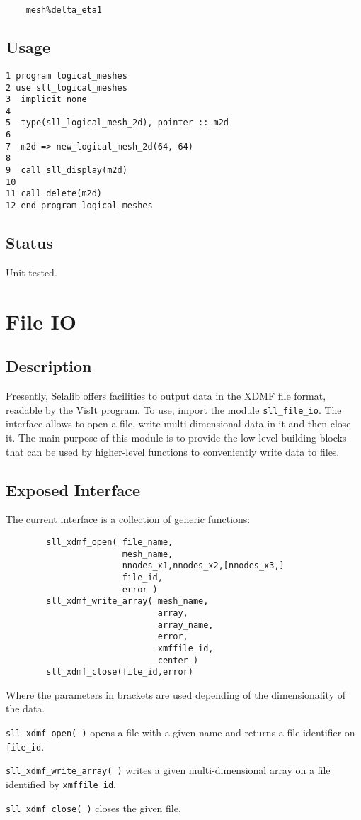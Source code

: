 \documentclass[]{report}   %
\begin{document}
\begin{verbatim}
    mesh%delta_eta1
\end{verbatim}

\subsection{Usage}

\begin{verbatim}
1 program logical_meshes
2 use sll_logical_meshes
3  implicit none
4
5  type(sll_logical_mesh_2d), pointer :: m2d
6  
7  m2d => new_logical_mesh_2d(64, 64)
8
9  call sll_display(m2d)
10
11 call delete(m2d)
12 end program logical_meshes
\end{verbatim}

\subsection{Status}
Unit-tested.


\section{File IO}

    \subsection{Description}
	Presently, Selalib offers facilities to output data in the XDMF file format, readable by the VisIt program. To use, import the module \verb+sll_file_io+. The interface allows to open a file, write multi-dimensional data in it and then close it. The main purpose of this module is to provide the low-level building blocks that can be used by higher-level functions to conveniently write data to files.

    \subsection{Exposed Interface}
    The current interface is a collection of generic functions:
    \begin{verbatim}
        sll_xdmf_open( file_name,
                       mesh_name,
                       nnodes_x1,nnodes_x2,[nnodes_x3,]
                       file_id,
                       error )
        sll_xdmf_write_array( mesh_name,
                              array,
                              array_name,
                              error,
                              xmffile_id,
                              center )
        sll_xdmf_close(file_id,error)
    \end{verbatim}
    Where the parameters in brackets are used depending of the dimensionality of the data.
    \begin{description}
       \item \verb+sll_xdmf_open( )+ opens a file with a given name and returns a file identifier on \verb+file_id+.
       \item \verb+sll_xdmf_write_array( )+ writes a given multi-dimensional array on a file identified by \verb+xmffile_id+.
       \item \verb+sll_xdmf_close( )+ closes the given file.
    \end{description}
\end{document}
